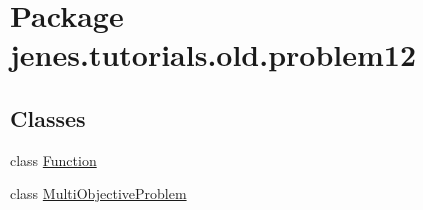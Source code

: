 \hypertarget{namespacejenes_1_1tutorials_1_1old_1_1problem12}{\section{Package jenes.\-tutorials.\-old.\-problem12}
\label{namespacejenes_1_1tutorials_1_1old_1_1problem12}
}
\subsection*{Classes}
\begin{DoxyCompactItemize}
\item 
class \hyperlink{classjenes_1_1tutorials_1_1old_1_1problem12_1_1_function}{Function}
\item 
class \hyperlink{classjenes_1_1tutorials_1_1old_1_1problem12_1_1_multi_objective_problem}{Multi\-Objective\-Problem}
\end{DoxyCompactItemize}
